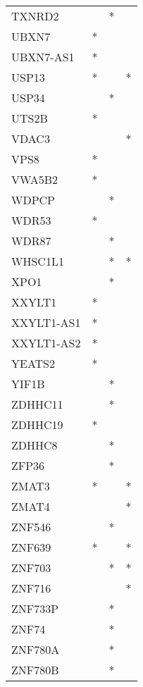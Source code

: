 \begin{longtable}{lccc}
TXNRD2           &       &  * &         \\
UBXN7            &     * &    &         \\
UBXN7-AS1        &     * &    &         \\
USP13            &     * &    &       * \\
USP34            &       &  * &         \\
UTS2B            &     * &    &         \\
VDAC3            &       &    &       * \\
VPS8             &     * &    &         \\
VWA5B2           &     * &    &         \\
WDPCP            &       &  * &         \\
WDR53            &     * &    &         \\
WDR87            &       &  * &         \\
WHSC1L1          &       &  * &       * \\
XPO1             &       &  * &         \\
XXYLT1           &     * &    &         \\
XXYLT1-AS1       &     * &    &         \\
XXYLT1-AS2       &     * &    &         \\
YEATS2           &     * &    &         \\
YIF1B            &       &  * &         \\
ZDHHC11          &       &  * &         \\
ZDHHC19          &     * &    &         \\
ZDHHC8           &       &  * &         \\
ZFP36            &       &  * &         \\
ZMAT3            &     * &    &       * \\
ZMAT4            &       &    &       * \\
ZNF546           &       &  * &         \\
ZNF639           &     * &    &       * \\
ZNF703           &       &  * &       * \\
ZNF716           &       &    &       * \\
ZNF733P          &       &  * &         \\
ZNF74            &       &  * &         \\
ZNF780A          &       &  * &         \\
ZNF780B          &       &  * &         \\
\end{longtable}
